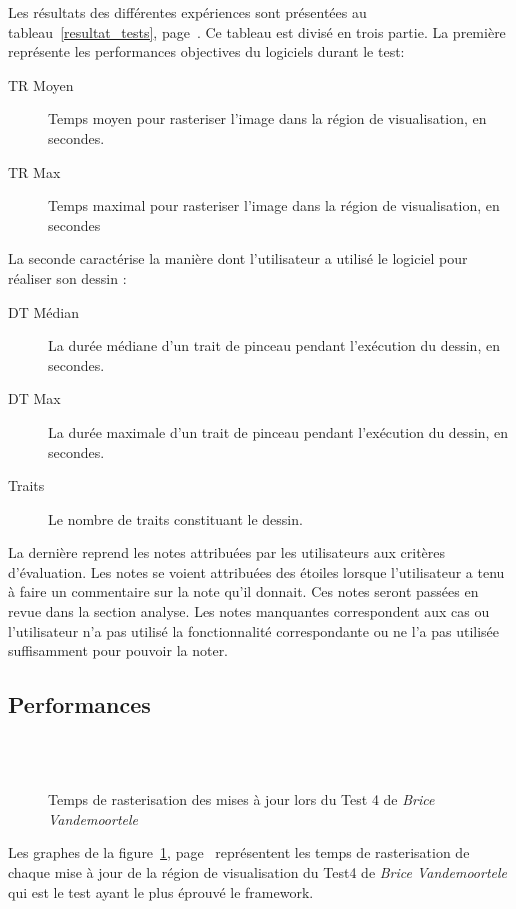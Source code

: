 	Les résultats des différentes expériences sont présentées au tableau~\ref{resultat_tests}, page~\pageref{resultat_tests}.
	Ce tableau est divisé en trois partie. La première représente les performances objectives du logiciels durant le test:
	\begin{description}
		\item[TR Moyen] Temps moyen pour rasteriser l'image dans la région de visualisation, en secondes.
		\item[TR Max] Temps maximal pour rasteriser l'image dans la région de visualisation, en secondes
	\end{description}
	La seconde caractérise la manière dont l'utilisateur a utilisé le logiciel pour réaliser son dessin :
	\begin{description}
		\item[DT Médian] La durée médiane d'un trait de pinceau pendant l'exécution du dessin, en secondes.
		\item[DT Max] La durée maximale d'un trait de pinceau pendant l'exécution du dessin, en secondes.
		\item[Traits] Le nombre de traits constituant le dessin.
	\end{description}
	La dernière reprend les notes attribuées par les utilisateurs aux critères d'évaluation. Les notes se voient attribuées
	des étoiles lorsque l'utilisateur a tenu à faire un commentaire sur la note qu'il donnait. Ces notes seront passées
	en revue dans la section analyse. Les notes manquantes correspondent aux cas ou l'utilisateur n'a pas utilisé la
	fonctionnalité correspondante ou ne l'a pas utilisée suffisamment pour pouvoir la noter.
	\subsection{Performances}

	\begin{figure}[h]
		\centering
		\\
		\\
		\caption{Temps de rasterisation des mises à jour lors du Test 4 de \emph{Brice Vandemoortele}}
		\label{fig:paintperf}
	\end{figure}
	Les graphes de la figure~\ref{fig:paintperf}, page~\pageref{fig:paintperf} représentent les temps de rasterisation de chaque 
	mise à jour de la région de visualisation du Test4 de \emph{Brice Vandemoortele} qui est le test ayant le plus éprouvé le framework. 

